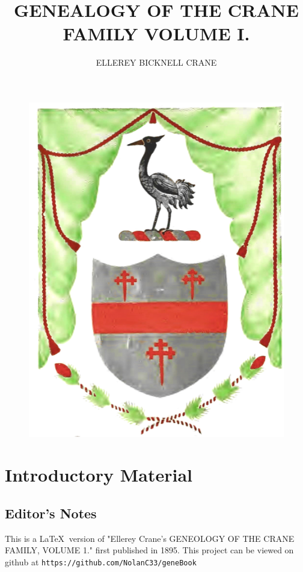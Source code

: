 \documentclass[oneside]{book}
\begin{document}
\title{GENEALOGY OF THE CRANE FAMILY VOLUME I.}
\author{ELLEREY BICKNELL CRANE}

\maketitle

\begin{figure}[t]
\includegraphics{../mouthOfHorse/crest1.png}
\centering
\end{figure}

\tableofcontents

\chapter{Introductory Material}

\section{Editor's Notes}

This is a \LaTeX $\:$ version of "Ellerey Crane's GENEOLOGY OF THE CRANE FAMILY, VOLUME 1." first published in 1895. This project can be viewed on github at \texttt{https://github.com/NolanC33/geneBook}
\end{document}
